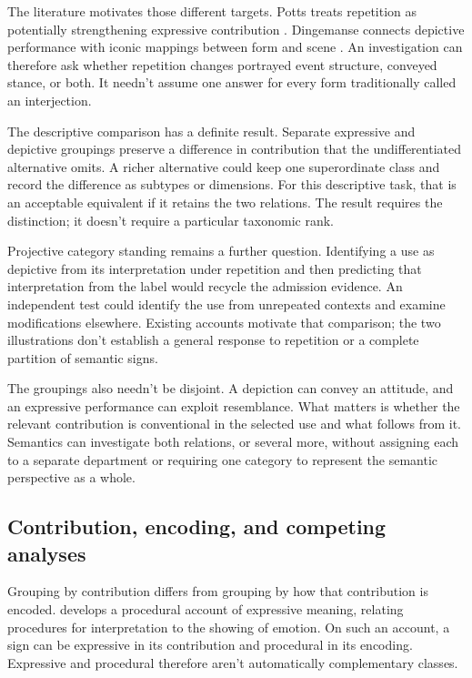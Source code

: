 The literature motivates those different targets. Potts treats repetition
as potentially strengthening expressive contribution \citep[180--182]{potts2007}.
Dingemanse connects depictive performance with iconic mappings between
form and scene \citep[9--11]{dingemanse2018}. An investigation can therefore
ask whether repetition changes portrayed event structure, conveyed stance,
or both. It needn't assume one answer for every form traditionally
called an interjection.

The descriptive comparison has a definite result. Separate expressive
and depictive groupings preserve a difference in contribution that the
undifferentiated alternative omits. A richer alternative could keep one
superordinate class and record the difference as subtypes or dimensions.
For this descriptive task, that is an acceptable equivalent if it retains
the two relations. The result requires the distinction; it doesn't require
a particular taxonomic rank.

Projective category standing remains a further question. Identifying a use
as depictive from its interpretation under repetition and then predicting
that interpretation from the label would recycle the admission evidence.
An independent test could identify the use from unrepeated contexts and
examine modifications elsewhere. Existing accounts motivate that comparison;
the two illustrations don't establish a general response to repetition or
a complete partition of semantic signs.

The groupings also needn't be disjoint. A depiction can convey an attitude,
and an expressive performance can exploit resemblance. What matters is
whether the relevant contribution is conventional in the selected use and
what follows from it. Semantics can investigate both relations, or several
more, without assigning each to a separate department or requiring one
category to represent the semantic perspective as a whole.

\subsection{Contribution, encoding, and competing analyses}

Grouping by contribution differs from grouping by how that contribution
is encoded. \textcite{wharton2016expressives} develops a procedural account
of expressive meaning, relating procedures for interpretation to the
showing of emotion. On such an account, a sign can be expressive in its
contribution and procedural in its encoding. Expressive and procedural
therefore aren't automatically complementary classes.


